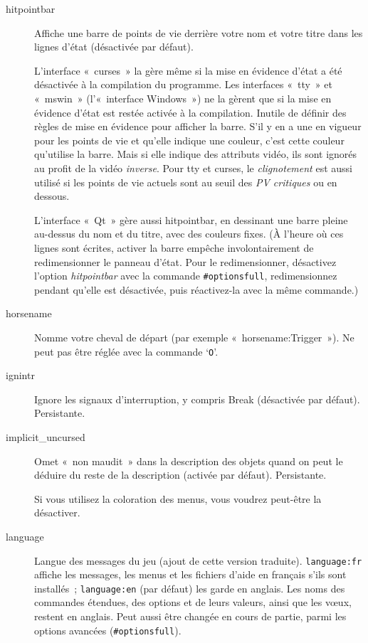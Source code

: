 \documentclass[titlepage]{article}
\begin{document}
\begin{description}
\item[{hitpointbar}]
Affiche une barre de points de vie derrière votre nom et votre titre dans
les lignes d'état (désactivée par défaut).


L'interface «~curses~» la gère même si la mise en évidence d'état a
été désactivée à la compilation du programme.
Les interfaces «~tty~» et «~mswin~» (l'«~interface
Windows~») ne la gèrent que si la mise en évidence d'état est restée
activée à la compilation.
Inutile de définir des règles de mise en évidence pour afficher la barre.
S'il y en a une en vigueur pour les points de vie et qu'elle indique une
couleur, c'est cette couleur qu'utilise la barre.
Mais si elle indique des attributs vidéo, ils sont ignorés au profit de la
vidéo \textit{inverse}.
Pour tty et curses, le \textit{clignotement} est aussi utilisé si les points
de vie actuels sont au seuil des \textit{PV critiques} ou en dessous.


L'interface «~Qt~» gère aussi hitpointbar, en dessinant une barre
pleine au-dessus du nom et du titre, avec des couleurs fixes.
(À l'heure où ces lignes sont écrites, activer la barre empêche
involontairement de redimensionner le panneau d'état.
Pour le redimensionner, désactivez l'option \textit{hitpointbar} avec la
commande \texttt{\#optionsfull}, redimensionnez pendant qu'elle est
désactivée, puis réactivez-la avec la même commande.)

\item[{horsename}]
Nomme votre cheval de départ (par exemple «~horsename:Trigger~»).
Ne peut pas être réglée avec la commande `\texttt{O}'.

\item[{ignintr}]
Ignore les signaux d'interruption, y compris Break (désactivée par
défaut).
Persistante.

\item[{implicit\_uncursed}]
Omet «~non maudit~» dans la description des objets quand on peut le
déduire du reste de la description (activée par défaut).
Persistante.


Si vous utilisez la coloration des menus, vous voudrez peut-être la
désactiver.

\item[{language}]
Langue des messages du jeu (ajout de cette version traduite).
\texttt{language:fr} affiche les messages, les menus et les fichiers d'aide
en français s'ils sont installés~; \texttt{language:en} (par défaut) les
garde en anglais.
Les noms des commandes étendues, des options et de leurs valeurs, ainsi
que les vœux, restent en anglais.
Peut aussi être changée en cours de partie, parmi les options avancées
(\texttt{\#optionsfull}).



\end{description}
\end{document}
